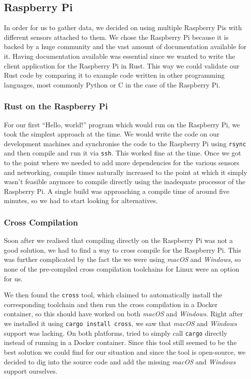 \subsection{Raspberry Pi}

In order for us to gather data, we decided on using multiple Raspberry Pis with different sensors
attached to them. We chose the Raspberry Pi because it is backed by a huge community and the vast
amount of documentation available for it. Having documentation available was essential since we
wanted to write the client application for the Raspberry Pi in Rust. This way we could validate our
Rust code by comparing it to example code written in other programming languages, most commonly
Python or C in the case of the Raspberry Pi.

\subsubsection{Rust on the Raspberry Pi}

For our first “Hello, world!” program which would run on the Raspberry Pi, we took the simplest
approach at the time. We would write the code on our development machines and synchronise the code
to the Raspberry Pi using \texttt{rsync} and then compile and run it via \texttt{ssh}. This worked
fine at the time. Once we got to the point where we needed to add more dependencies for the various
sensors and networking, compile times naturally increased to the point at which it simply wasn't
feasible anymore to compile directly using the inadequate processor of the Raspberry Pi. A single
build was approaching a compile time of around five minutes, so we had to start looking for
alternatives.

\subsubsection{Cross Compilation}

Soon after we realised that compiling directly on the Raspberry Pi was not a good solution, we had
to find a way to cross compile for the Raspberry Pi. This was further complicated by the fact the we
were using \textit{macOS} and \textit{Windows}, so none of the pre-compiled cross compilation
toolchains for Linux were an option for us.

We then found the \texttt{cross} tool, which claimed to automatically install the corresponding
toolchain and then run the cross compilation in a Docker container, so this should have worked on
both \textit{macOS} and \textit{Windows}. Right after we installed it using \texttt{cargo install
cross}, we saw that \textit{macOS} and \textit{Windows} support was lacking. On both platforms,
tried to simply call \texttt{cargo} directly instead of running in a Docker container. Since this
tool still seemed to be the best solution we could find for our situation and since the tool is
open-source, we decided to dig into the source code and add the missing \textit{macOS} and
\textit{Windows} support ourselves.

